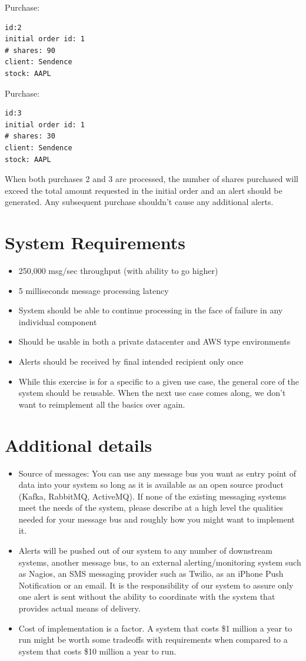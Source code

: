\documentclass[captions=tableheading]{scrreprt}
\begin{document}
Purchase:
\begin{verbatim}
id:2
initial order id: 1
# shares: 90
client: Sendence
stock: AAPL
\end{verbatim}

Purchase:
\begin{verbatim}
id:3
initial order id: 1
# shares: 30
client: Sendence
stock: AAPL
\end{verbatim}

When both purchases 2 and 3 are processed, the number of shares
purchased will exceed the total amount requested in the initial order
and an alert should be generated. Any subsequent purchase shouldn’t
cause any additional alerts.

\section{System Requirements}
\label{sec:orgheadline5}
\begin{itemize}
\item 250,000 msg/sec throughput (with ability to go higher)
\item 5 milliseconds message processing latency
\item System should be able to continue processing in the face of failure
in any individual component
\item Should be usable in both a private datacenter and AWS type
environments
\item Alerts should be received by final intended recipient only once
\item While this exercise is for a specific to a given use case, the
general core of the system should be reusable. When the next use
case comes along, we don’t want to reimplement all the basics over
again.
\end{itemize}

\section{Additional details}
\label{sec:orgheadline6}
\begin{itemize}
\item Source of messages: You can use any message bus you want as entry
point of data into your system so long as it is available as an open
source product (Kafka, RabbitMQ, ActiveMQ). If none of the existing
messaging systems meet the needs of the system, please describe at a
high level the qualities needed for your message bus and roughly how
you might want to implement it.
\item Alerts will be pushed out of our system to any number of downstream
systems, another message bus, to an external alerting/monitoring
system such as Nagios, an SMS messaging provider such as Twilio, as
an iPhone Push Notification or an email. It is the responsibility of
our system to assure only one alert is sent without the ability to
coordinate with the system that provides actual means of delivery.
\item Cost of implementation is a factor. A system that costs \$1 million a
year to run might be worth some tradeoffs with requirements when
compared to a system that costs \$10 million a year to run.
\end{itemize}
\end{document}
